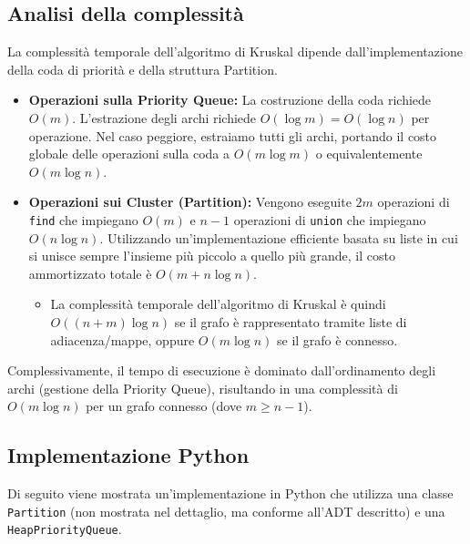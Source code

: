 \subsection*{Analisi della complessità}
La complessità temporale dell'algoritmo di Kruskal dipende dall'implementazione della coda di priorità e della struttura Partition.
\begin{itemize}
    \item \textbf{Operazioni sulla Priority Queue:} La costruzione della coda richiede $O(m)$. L'estrazione degli archi richiede $O(\log m) = O(\log n)$ per operazione. Nel caso peggiore, estraiamo tutti gli archi, portando il costo globale delle operazioni sulla coda a $O(m \log m)$ o equivalentemente $O(m \log n)$.
    \item \textbf{Operazioni sui Cluster (Partition):} Vengono eseguite $2m$ operazioni di \texttt{find} che impiegano $O(m)$ e $n-1$ operazioni di \texttt{union} che impiegano $O(n \log n)$. Utilizzando un'implementazione efficiente basata su liste in cui si unisce sempre l'insieme più piccolo a quello più grande, il costo ammortizzato totale è $O(m + n \log n)$.
    \begin{itemize}
        \item La complessità temporale dell'algoritmo di Kruskal è quindi $O((n + m) \log n)$ se il grafo è rappresentato tramite liste di adiacenza/mappe, oppure $O(m \log n)$ se il grafo è connesso.
    \end{itemize}
\end{itemize}

\noindent
Complessivamente, il tempo di esecuzione è dominato dall'ordinamento degli archi (gestione della Priority Queue), risultando in una complessità di $O(m \log n)$ per un grafo connesso (dove $m \geq n-1$).

\clearpage
\subsection*{Implementazione Python}
Di seguito viene mostrata un'implementazione in Python che utilizza una classe \texttt{Partition} (non mostrata nel dettaglio, ma conforme all'ADT descritto) e una \texttt{HeapPriorityQueue}.

